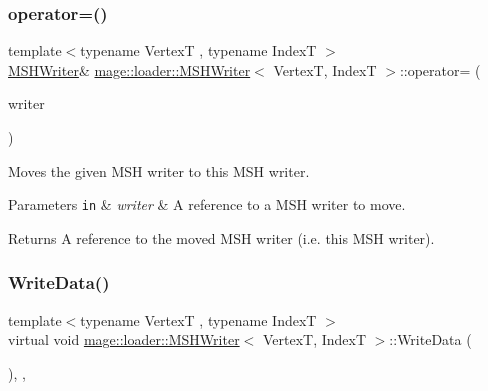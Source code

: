 \subsubsection{\texorpdfstring{operator=()}{operator=()}\hspace{0.1cm}{\footnotesize\ttfamily [2/2]}}
{\footnotesize\ttfamily template$<$typename VertexT , typename IndexT $>$ \\
\hyperlink{classmage_1_1loader_1_1_m_s_h_writer}{M\+S\+H\+Writer}\& \hyperlink{classmage_1_1loader_1_1_m_s_h_writer}{mage\+::loader\+::\+M\+S\+H\+Writer}$<$ VertexT, IndexT $>$\+::operator= (\begin{DoxyParamCaption}\item[{\hyperlink{classmage_1_1loader_1_1_m_s_h_writer}{M\+S\+H\+Writer}$<$ VertexT, IndexT $>$ \&\&}]{writer }\end{DoxyParamCaption})\hspace{0.3cm}{\ttfamily [delete]}}

Moves the given M\+SH writer to this M\+SH writer.


\begin{DoxyParams}[1]{Parameters}
\mbox{\tt in}  & {\em writer} & A reference to a M\+SH writer to move. \\
\hline
\end{DoxyParams}
\begin{DoxyReturn}{Returns}
A reference to the moved M\+SH writer (i.\+e. this M\+SH writer). 
\end{DoxyReturn}
\hypertarget{classmage_1_1loader_1_1_m_s_h_writer_ae1e53fa4139266fa88c9ee581dbf35b7}{}\label{classmage_1_1loader_1_1_m_s_h_writer_ae1e53fa4139266fa88c9ee581dbf35b7} 
\subsubsection{\texorpdfstring{Write\+Data()}{WriteData()}}
{\footnotesize\ttfamily template$<$typename VertexT , typename IndexT $>$ \\
virtual void \hyperlink{classmage_1_1loader_1_1_m_s_h_writer}{mage\+::loader\+::\+M\+S\+H\+Writer}$<$ VertexT, IndexT $>$\+::Write\+Data (\begin{DoxyParamCaption}{ }\end{DoxyParamCaption})\hspace{0.3cm}{\ttfamily [override]}, {\ttfamily [private]}, {\ttfamily [virtual]}}

